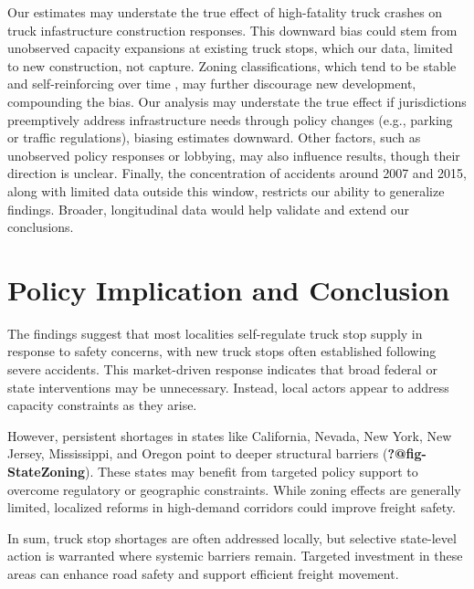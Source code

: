\documentclass[
  12pt]{article}
\begin{document}
Our estimates may understate the true effect of high-fatality truck
crashes on truck infastructure construction responses. This downward
bias could stem from unobserved capacity expansions at existing truck
stops, which our data, limited to new construction, not capture. Zoning
classifications, which tend to be stable and self-reinforcing over time
\citep{mclaughlinLandUseRegulation2012}, may further discourage new
development, compounding the bias. Our analysis may understate the true
effect if jurisdictions preemptively address infrastructure needs
through policy changes (e.g., parking or traffic regulations), biasing
estimates downward. Other factors, such as unobserved policy responses
or lobbying, may also influence results, though their direction is
unclear. Finally, the concentration of accidents around 2007 and 2015,
along with limited data outside this window, restricts our ability to
generalize findings. Broader, longitudinal data would help validate and
extend our conclusions.

\section{Policy Implication and
Conclusion}\label{policy-implication-and-conclusion}

The findings suggest that most localities self-regulate truck stop
supply in response to safety concerns, with new truck stops often
established following severe accidents. This market-driven response
indicates that broad federal or state interventions may be unnecessary.
Instead, local actors appear to address capacity constraints as they
arise.

However, persistent shortages in states like California, Nevada, New
York, New Jersey, Mississippi, and Oregon point to deeper structural
barriers (\textbf{?@fig-StateZoning}). These states may benefit from
targeted policy support to overcome regulatory or geographic
constraints. While zoning effects are generally limited, localized
reforms in high-demand corridors could improve freight safety.

In sum, truck stop shortages are often addressed locally, but selective
state-level action is warranted where systemic barriers remain. Targeted
investment in these areas can enhance road safety and support efficient
freight movement.
\end{document}
